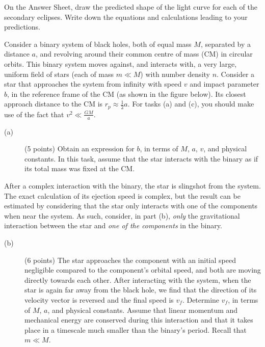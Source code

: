 On the Answer Sheet, draw the predicted shape of the light curve for each of
the secondary eclipses. Write down the equations and calculations leading to
your predictions.

Consider a binary system of black holes, both of equal mass $M$, separated by
a distance $a$, and revolving around their common centre of mass (CM) in
circular orbits. This binary system moves against, and interacts with, a very
large, uniform field of stars (each of mass $m \ll M$) with number density
$n$. Consider a star that approaches the system from infinity with speed $v$
and impact parameter $b$, in the reference frame of the CM (as shown in the
figure below). Its closest approach distance to the CM is
$r_p \approx \frac{1}{2}a$. For tasks (a) and (c), you should make use of the
fact that $v^2 \ll \frac{GM}{a}$.

\begin{description}
\item[(a)] (5 points) Obtain an expression for $b$, in terms of $M$, $a$,
  $v$, and physical constants. In this task, assume that the star interacts
  with the binary as if its total mass was fixed at the CM.
\end{description}

After a complex interaction with the binary, the star is slingshot from the
system. The exact calculation of its ejection speed is complex, but the
result can be estimated by considering that the star only interacts with one
of the components when near the system. As such, consider, in part (b),
\emph{only} the gravitational interaction between the star and \emph{one of
the components} in the binary.

\begin{description}
\item[(b)] (6 points) The star approaches the component with an initial
  speed negligible compared to the component's orbital speed, and both are
  moving directly towards each other. After interacting with the system,
  when the star is again far away from the black hole, we find that the
  direction of its velocity vector is reversed and the final speed is
  $v_f$. Determine $v_f$, in terms of $M$, $a$, and physical constants.
  Assume that linear momentum and mechanical energy are conserved during
  this interaction and that it takes place in a timescale much smaller than
  the binary's period. Recall that $m \ll M$.
\end{description}

